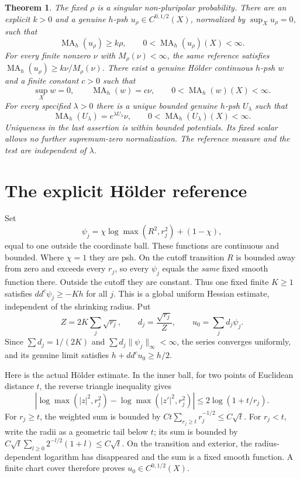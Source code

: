 \documentclass[11pt]{article}
\newcommand{\ddc}{dd^c}
\newcommand{\MA}{\operatorname{MA}}
\newtheorem{theorem}{Theorem}
\begin{document}
\begin{theorem}\label{thm:main}
The fixed $\rho$ is a singular non-pluripolar probability. There are
an explicit $k>0$ and a genuine $h$-psh $u_\rho\in C^{0,1/2}(X)$,
normalized by $\sup_Xu_\rho=0$, such that
\[
 \MA_h(u_\rho)\geq k\rho,\qquad
 0<\MA_h(u_\rho)(X)<\infty.
\]
For every finite nonzero $\nu$ with $M_\rho(\nu)<\infty$, the same
reference satisfies $\MA_h(u_\rho)\geq k\nu/M_\rho(\nu)$.
There exist a genuine H\"older continuous $h$-psh $w$ and a finite
constant $c>0$ such that
\[
 \sup_X w=0,\qquad\MA_h(w)=c\nu,
 \qquad0<\MA_h(w)(X)<\infty.
\]
For every specified $\lambda>0$ there is a unique bounded genuine
$h$-psh $U_\lambda$ such that
\[
 \MA_h(U_\lambda)=e^{\lambda U_\lambda}\nu,
 \qquad0<\MA_h(U_\lambda)(X)<\infty.
\]
Uniqueness in the last assertion is within bounded potentials. Its fixed
scalar allows no further supremum-zero normalization. The reference
measure and the test are independent of $\lambda$.
\end{theorem}

\section{The explicit H\"older reference}
Set
\[
 \psi_j=\chi\log\max(R^2,r_j^2)+(1-\chi),
\]
equal to one outside the coordinate ball. These functions are continuous
and bounded. Where $\chi=1$ they are psh. On the cutoff transition
$R$ is bounded away from zero and exceeds every $r_j$, so every
$\psi_j$ equals the \emph{same} fixed smooth function there.
Outside the cutoff they are constant. Thus one fixed finite $K\geq1$
satisfies $\ddc\psi_j\geq-Kh$ for all $j$. This is a global
uniform Hessian estimate, independent of the shrinking radius.
Put
\[
 Z=2K\sum_j\sqrt{r_j},\qquad d_j=\frac{\sqrt{r_j}}Z,
 \qquad u_0=\sum_jd_j\psi_j.
\]
Since $\sum d_j=1/(2K)$ and
$\sum d_j\|\psi_j\|_\infty<\infty$, the series converges uniformly,
and its genuine limit satisfies $h+\ddc u_0\geq h/2$.

Here is the actual H\"older estimate. In the inner ball, for two points
of Euclidean distance $t$, the reverse triangle inequality gives
\[
 |\log\max(|z|^2,r_j^2)-\log\max(|z'|^2,r_j^2)|
 \leq2\log(1+t/r_j).
\]
For $r_j\geq t$, the weighted sum is bounded by
$C t\sum_{r_j\geq t}r_j^{-1/2}\leq C\sqrt t$.
For $r_j<t$, write the radii as a geometric tail below $t$; its sum
is bounded by
$C\sqrt t\sum_{l\geq0}2^{-l/2}(1+l)\leq C\sqrt t$.
On the transition and exterior, the radius-dependent logarithm has
disappeared and the sum is a fixed smooth function. A finite chart
cover therefore proves $u_0\in C^{0,1/2}(X)$.
\end{document}

